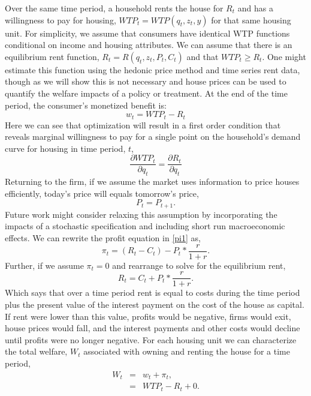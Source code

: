 \documentclass[ecta,nameyear,draft]{econsocart}
\theoremstyle{plain}
\theoremstyle{remark}
\begin{document}
Over the same time period, a household rents the house for $R_t$ and has a willingness to pay for housing, $\mathit{WTP}_t=\mathit{WTP}(q_t,z_t,y)$ for that same housing unit. For simplicity, we assume that consumers have identical WTP functions conditional on income and housing attributes. We can assume that there is an equilibrium rent function, $R_t=R(q_t,z_t,P_t,C_t)$ and that $\mathit{WTP}_t \geq R_t$. One might estimate this function using the hedonic price method and time series rent data, though as we will show this is not necessary and house prices can be used to quantify the welfare impacts of a policy or treatment. 
At the end of the time period, the consumer’s monetized benefit is:
\begin{equation*}
	 w_t=\mathit{WTP}_t-R_t
\end{equation*}
Here we can see that optimization will result in a first order condition that reveals marginal willingness
to pay for a single point on the household’s demand curve for housing in time period, $t$,
\begin{equation}
	\frac{\partial \mathit{WTP}_t}{\partial q_t}=\frac{\partial R_t}{\partial q_t} \label{foc}
\end{equation}
Returning to  	the firm, if we assume the market uses information to price houses efficiently, today’s price will equals tomorrow’s
price,
\begin{equation*}
	P_t=P_{t+1}.
\end{equation*}
Future work might consider relaxing this assumption by incorporating the impacts of a stochastic
specification and including short run macroeconomic effects.
We can rewrite the profit equation in \ref{pi1} as,
\begin{equation}
	\pi_t=(R_t-C_t)-P_t*\frac{r}{1+r}.\label{pi1.1}
\end{equation}
Further, if we assume $\pi_t=0$ and rearrange to solve for the equilibrium rent,
\begin{equation}
	R_t=C_t+P_t*\frac{r}{1+r}.\label{rent1}
\end{equation}
Which says that over a time period rent is equal to costs during the time period plus the present value of
the interest payment on the cost of the house as capital. If rent were lower than this value, profits
would be negative, firms would exit, house prices would fall, and the interest payments and other costs
would decline until profits were no longer negative.
For each housing unit we can characterize the total welfare, $W_t$ associated with owning and renting the house for a time period,
\begin{eqnarray*}
	W_t & = & w_t+\pi_t,\\
	& = & \mathit{WTP}_t-R_t+0.
\end{eqnarray*}
\end{document}
